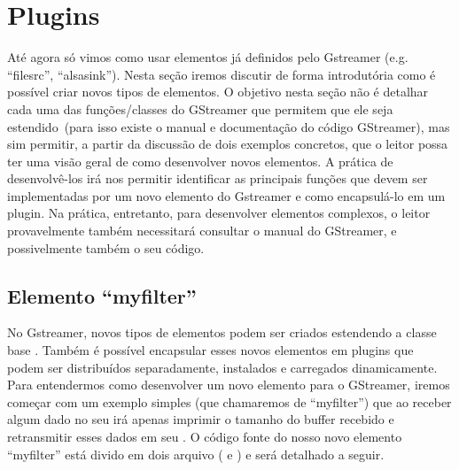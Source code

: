 \section{Plugins}
\label{sec:plugins}


Até agora só vimos como usar elementos já definidos pelo Gstreamer (e.g.
``filesrc'', ``alsasink'').  Nesta seção iremos discutir de forma introdutória
como é possível criar novos tipos de elementos.  O objetivo nesta seção não é
detalhar cada uma das funções/classes do GStreamer que permitem que ele seja
estendido~(para isso existe o manual e documentação do código GStreamer), mas
sim permitir, a partir da discussão de dois exemplos concretos, que o
leitor possa ter uma visão geral de como desenvolver novos elementos.  A
prática de desenvolvê-los irá nos permitir identificar as principais funções
que devem ser implementadas por um novo elemento do Gstreamer e como
encapsulá-lo em um plugin.  Na prática, entretanto, para desenvolver elementos
complexos, o leitor provavelmente também necessitará consultar o manual do
GStreamer, e possivelmente também o seu código.

\subsection*{Elemento ``myfilter''}
No Gstreamer, novos tipos de elementos podem ser criados estendendo a classe
base .  Também é possível encapsular esses novos elementos em
plugins que podem ser distribuídos separadamente, instalados e carregados
dinamicamente.  Para entendermos como desenvolver um novo elemento para o
GStreamer, iremos começar com um exemplo simples (que chamaremos de
``myfilter'') que ao receber algum dado no seu  irá apenas
imprimir o tamanho do buffer recebido e retransmitir esses dados em seu
.  O código fonte do nosso novo elemento ``myfilter'' está
divido em dois arquivo ( e ) e será detalhado a
seguir.


